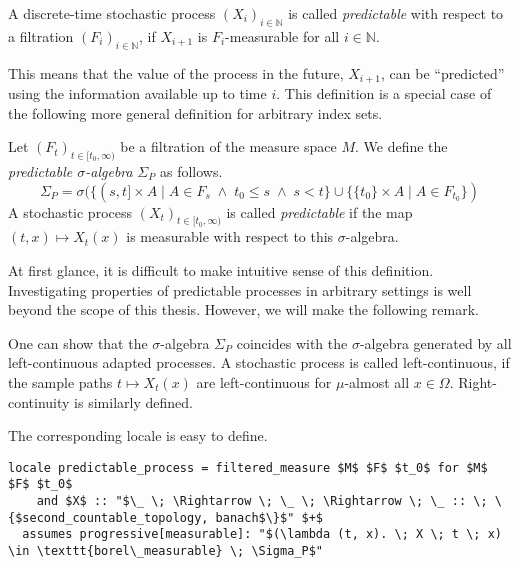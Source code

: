 \begin{definition}
	A discrete-time stochastic process $(X_i)_{i\in\mathbb{N}}$ is called \textit{predictable} with respect to a filtration $(F_i)_{i\in\mathbb{N}}$, if $X_{i + 1}$ is $F_i$-measurable for all $i \in \mathbb{N}$.
\end{definition}

This means that the value of the process in the future, $X_{i+1}$, can be ``predicted'' using the information available up to time $i$. This definition is a special case of the following more general definition for arbitrary index sets.

\begin{definition}
	Let $(F_t)_{t\in[t_0, \infty)}$ be a filtration of the measure space $M$. We define the \textit{predictable $\sigma$-algebra} $\Sigma_P$ as follows.
	\[
		\Sigma_P = \sigma(\{(s,t] \times A \;\vert\; A \in F_s \;\wedge\; t_0 \le s \;\wedge\; s < t \} \cup \{\{t_0\} \times A \;\vert\; A \in F_{t_0}\})
	\]
	A stochastic process $(X_t)_{t\in[t_0, \infty)}$ is called \textit{predictable} if the map $(t,x) \mapsto X_t(x)$ is measurable with respect to this $\sigma$-algebra.
\end{definition}

At first glance, it is difficult to make intuitive sense of this definition. Investigating properties of predictable processes in arbitrary settings is well beyond the scope of this thesis. However, we will make the following remark.

\begin{remark}
	One can show that the $\sigma$-algebra $\Sigma_P$ coincides with the $\sigma$-algebra generated by all left-continuous adapted processes. A stochastic process is called left-continuous, if the sample paths $t \mapsto X_t(x)$ are left-continuous for $\mu$-almost all $x \in \Omega$. Right-continuity is similarly defined.
\end{remark}

The corresponding locale is easy to define.

\begin{isadefinition}
{\small
\begin{lstlisting}[style=isabelle]
locale predictable_process = filtered_measure $M$ $F$ $t_0$ for $M$ $F$ $t_0$
	and $X$ :: "$\_ \; \Rightarrow \; \_ \; \Rightarrow \; \_ :: \; \{$second_countable_topology, banach$\}$" $+$
  assumes progressive[measurable]: "$(\lambda (t, x). \; X \; t \; x) \in \texttt{borel\_measurable} \; \Sigma_P$"
\end{lstlisting}
}
\end{isadefinition}

